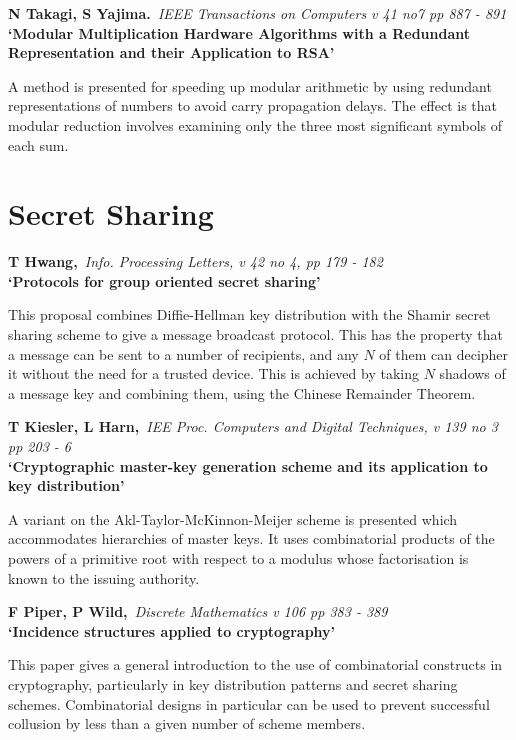 {\bf \noindent N Takagi, S Yajima.}{\em ~IEEE Transactions on Computers 
v 41 no7 pp 887 - 891\\}
{\bf `Modular Multiplication Hardware Algorithms with a Redundant 
Representation and their Application to RSA'}

A method is presented for speeding up modular arithmetic by using
redundant representations of numbers to avoid carry propagation delays.
The effect is that modular reduction involves examining only the three
most significant symbols of each sum.




\normalsize
\section{Secret Sharing}
\small

{\bf \noindent T Hwang,}{\em ~Info. Processing Letters, v 42 no 4, pp 179 -
182\\}
{\bf `Protocols for group oriented secret sharing'}

This proposal combines Diffie-Hellman key distribution with the Shamir
secret sharing scheme to give a message broadcast protocol. This has the
property that a message can be sent to a number of recipients, and any
$N$ of them can decipher it without the need for a trusted device. This
is achieved by taking $N$ shadows of a message key and combining them, using
the Chinese Remainder Theorem.

{\bf \noindent T Kiesler, L Harn,}{\em ~IEE Proc. Computers and Digital
Techniques, v 139 no 3 pp 203 - 6\\}
{\bf `Cryptographic master-key generation scheme and its application to
key distribution'}

A variant on the Akl-Taylor-McKinnon-Meijer scheme is presented which
accommodates hierarchies of master keys. It uses combinatorial products of
the powers of a primitive root with respect to a modulus whose factorisation 
is known to the issuing authority.

{\bf \noindent F Piper, P Wild,}{\em ~Discrete Mathematics v 106 pp 383 - 
389\\}
{\bf `Incidence structures applied to cryptography'}

This paper gives a general introduction to the use of combinatorial constructs
in cryptography, particularly in key distribution patterns and secret sharing
schemes. Combinatorial designs in particular can be used to prevent successful
collusion by less than a given number of scheme members.

